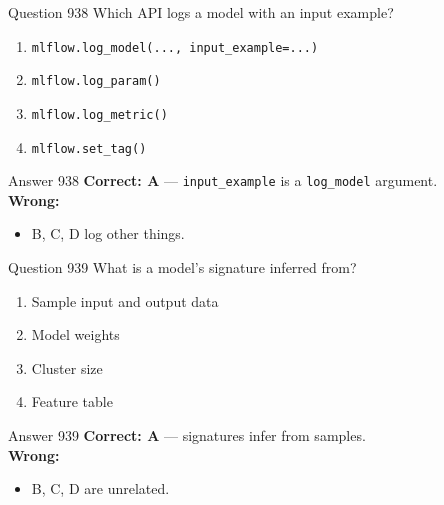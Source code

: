 \documentclass[aspectratio=169,11pt]{beamer}
\begin{document}
	\begin{frame}{Question 938}
		Which API logs a model with an input example?
		\begin{enumerate}[label=\Alph*.]
			\item \texttt{mlflow.log\_model(..., input\_example=...)}
			\item \texttt{mlflow.log\_param()}
			\item \texttt{mlflow.log\_metric()}
			\item \texttt{mlflow.set\_tag()}
		\end{enumerate}
	\end{frame}
	\begin{frame}{Answer 938}
		\textbf{Correct: A} --- \texttt{input\_example} is a \texttt{log\_model} argument.\\
		\vspace{0.5em}
		\textbf{Wrong:}
		\begin{itemize}
			\item B, C, D log other things.
		\end{itemize}
	\end{frame}
	
	\begin{frame}{Question 939}
		What is a model's signature inferred from?
		\begin{enumerate}[label=\Alph*.]
			\item Sample input and output data
			\item Model weights
			\item Cluster size
			\item Feature table
		\end{enumerate}
	\end{frame}
	\begin{frame}{Answer 939}
		\textbf{Correct: A} --- signatures infer from samples.\\
		\vspace{0.5em}
		\textbf{Wrong:}
		\begin{itemize}
			\item B, C, D are unrelated.
		\end{itemize}
	\end{frame}
	
\end{document}

